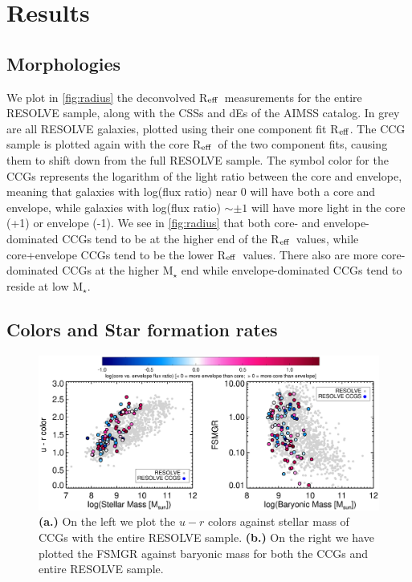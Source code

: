 \documentclass[iop,apj]{emulateapj}
\newcommand{\Reff}{R$_{\rm eff}$}
\begin{document}
\section{Results}
\label{results}

\subsection{Morphologies}
\label{morph}

We plot in \autoref{fig:radius} the deconvolved \Reff\ measurements for the entire RESOLVE sample, along with the CSSs and dEs of the AIMSS catalog. In grey are all RESOLVE galaxies, plotted using their one component fit \Reff. The CCG sample is plotted again with the core \Reff\ of the two component fits, causing them to shift down from the full RESOLVE sample. The symbol color for the CCGs represents the logarithm of the light ratio between the core and envelope, meaning that galaxies with log(flux ratio) near 0 will have both a core and envelope, while galaxies with log(flux ratio) $\sim \pm 1$ will have more light in the core (+1) or envelope (-1). We see in \autoref{fig:radius} that both core- and envelope-dominated CCGs tend to be at the higher end of the \Reff\ values, while core+envelope CCGs tend to be the lower \Reff\ values. There also are more core-dominated CCGs at the higher M$_{\star}$ end while envelope-dominated CCGs tend to reside at low M$_{\star}$.

\subsection{Colors and Star formation rates}

\begin{figure}[hbpt!]
\begin{center}
\includegraphics[scale=0.65]{sfr_mbary.eps}
\caption{\textbf{(a.)} On the left we plot the $u-r$ colors against stellar mass of CCGs with the entire RESOLVE sample. \textbf{(b.)} On the right we have plotted the FSMGR against baryonic mass for both the CCGs and entire RESOLVE sample. }
\label{fig:fsmgr}
\end{center}
\end{figure}
\end{document}
